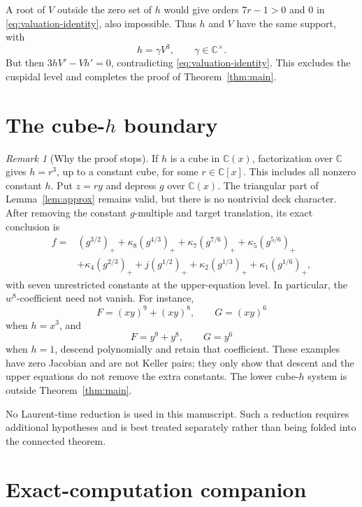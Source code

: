 \documentclass[11pt]{article}
\theoremstyle{definition}
\theoremstyle{remark}
\newtheorem{remark}[theorem]{Remark}
\newcommand{\C}{\mathbb C}
\begin{document}
A root of \(V\) outside the zero set of \(h\) would give orders
\(7r-1>0\) and \(0\) in \eqref{eq:valuation-identity}, also
impossible.  Thus \(h\) and \(V\) have the same support, with
\[
 h=\gamma V^3,\qquad \gamma\in\C^\times.
\]
But then \(3hV'-Vh'=0\), contradicting
\eqref{eq:valuation-identity}.  This excludes the cuspidal level and
completes the proof of Theorem~\ref{thm:main}.

\section{The cube-\(h\) boundary}
\label{sec:boundary}

\begin{remark}[Why the proof stops]
If \(h\) is a cube in \(\C(x)\), factorization over \(\C\) gives
\(h=r^3\), up to a constant cube, for some \(r\in\C[x]\).  This
includes all nonzero constant \(h\).  Put \(z=ry\) and depress \(g\)
over \(\C(x)\).  The triangular part of Lemma~\ref{lem:approx} remains
valid, but there is no nontrivial deck character.  After removing the
constant \(g\)-multiple and target translation, its exact conclusion is
\[
\begin{aligned}
 f={}&(g^{3/2})_+
 +\kappa _8(g^{4/3})_+
 +\kappa _7(g^{7/6})_+
 +\kappa _5(g^{5/6})_+\\
 &+\kappa _4(g^{2/3})_+
 +j(g^{1/2})_+
 +\kappa _2(g^{1/3})_+
 +\kappa _1(g^{1/6})_+ ,
\end{aligned}
\]
with seven unrestricted constants at the upper-equation level.  In
particular, the \(w^8\)-coefficient need not vanish.  For instance,
\[
 F=(xy)^9+(xy)^8,\qquad G=(xy)^6
\]
when \(h=x^3\), and
\[
 F=y^9+y^8,\qquad G=y^6
\]
when \(h=1\), descend polynomially and retain that coefficient.  These
examples have zero Jacobian and are not Keller pairs; they only show
that descent and the upper equations do not remove the extra constants.
The lower cube-\(h\) system is outside Theorem~\ref{thm:main}.
\end{remark}

No Laurent-time reduction is used in this manuscript.  Such a reduction
requires additional hypotheses and is best treated separately rather
than being folded into the connected theorem.

\appendix
\section{Exact-computation companion}
\end{document}
